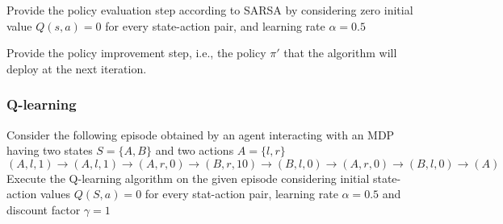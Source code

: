     Provide the policy evaluation step according to SARSA by considering zero initial value $Q(s,a)=0$ for every state-action pair, and learning rate $\alpha=0.5$


    Provide the policy improvement step, i.e., the policy $\pi'$ that the algorithm will deploy at the next iteration.


\subsubsection{Q-learning}
    Consider the following episode obtained by an agent interacting with an MDP having two states $S=\{A,B\}$ and two actions $A=\{l,r\}$
    $$(A,l,1)\rightarrow(A,l,1)\rightarrow(A,r,0)\rightarrow(B,r,10)\rightarrow(B,l,0)\rightarrow(A,r,0)\rightarrow(B,l,0)\rightarrow(A)$$
    Execute the Q-learning algorithm on the given episode considering initial state-action values $Q(S,a)=0$ for every stat-action pair, learning rate $\alpha=0.5$ and discount factor $\gamma=1$

